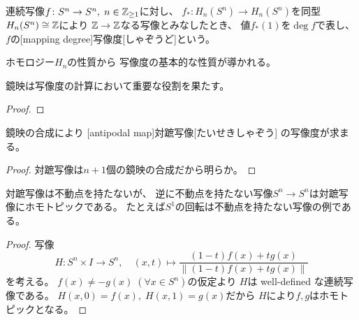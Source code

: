 \documentclass[report]{jlreq}
\begin{document}
\begin{definition}[写像度]
    連続写像$f \colon S^n \to S^n, \; n \in \mathbb{Z}_{\ge 1}$に対し、
    $f_* \colon H_n(S^n) \to H_n(S^n)$を同型$H_n(S^n) \cong \mathbb{Z}$により
    $\mathbb{Z} \to \mathbb{Z}$なる写像とみなしたとき、
    値$f_*(1)$を$\deg f$で表し、
    $f$の[mapping degree]{写像度}[しゃぞうど]という。
\end{definition}

ホモロジー$H_n$の性質から
写像度の基本的な性質が導かれる。

\begin{proposition}[写像度の基本性質]
    \TODO{}
\end{proposition}

鏡映は写像度の計算において重要な役割を果たす。


\begin{proof}
    \TODO{}
\end{proof}

鏡映の合成により
[antipodal map]{対蹠写像}[たいせきしゃぞう]
の写像度が求まる。


\begin{proof}
    対蹠写像は$n + 1$個の鏡映の合成だから明らか。
\end{proof}

対蹠写像は不動点を持たないが、
逆に不動点を持たない写像$S^n \to S^n$は対蹠写像にホモトピックである。
たとえば$S^1$の回転は不動点を持たない写像の例である。


\begin{proof}
    写像
    \begin{equation}
        H \colon S^n \times I \to S^n,
        \quad
        (x, t) \mapsto \frac{(1 - t) f(x) + t g(x)}{\| (1 - t) f(x) + t g(x) \|}
    \end{equation}
    を考える。
    $f(x) \neq -g(x) \; (\forall x \in S^n)$の仮定より
    $H$は well-defined な連続写像である。
    $H(x, 0) = f(x), \; H(x, 1) = g(x)$だから
    $H$により$f, g$はホモトピックとなる。
\end{proof}
\end{document}
